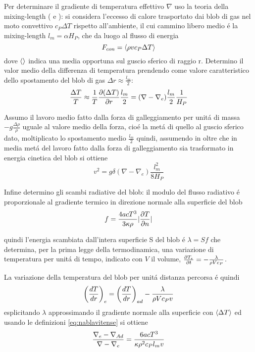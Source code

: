 \documentclass[../main.tex]{subfiles}
\begin{document}
Per determinare il gradiente di temperatura effettivo $\nabla$ uso la teoria della mixing-length (\cite{prandtl25tur} e \cite{vitense53kon}):
si considera l'eccesso di calore trasportato dai blob di gas nel moto convettivo $c_P\Delta T$ rispetto all'ambiente, il cui cammino libero medio \'e la mixing-length $l_m=\alpha H_P$, che da luogo al flusso di energia
\begin{equation}
F_{con}=\exv{\rho vc_P\Delta T}\label{eq:convectiveflux}
\end{equation}
dove $\exv{}$ indica una media opportuna sul guscio sferico di raggio r. Determino il valor medio della differenza di temperatura prendendo come valore caratteristico dello spostamento del blob di gas $\Delta r\approx\frac{l_m}{2}$:
\begin{equation}
\frac{\Delta T}{T}\approx\frac{1}{T}\PDy{r}{(\Delta T)}\frac{l_m}{2}=(\nabla-\nabla_e)\frac{l_m}{2}\frac{1}{H_P}
\end{equation}

Assumo il lavoro medio fatto dalla forza di galleggiamento per unit\'a di massa $-g\frac{\Delta\rho}{\rho}$ uguale al valore medio della forza, cio\'e la met\'a di quello al guscio sferico dato, moltiplicato lo spostamento medio $\frac{l_m}{2}$ quindi, assumendo in oltre che in media met\'a del lavoro fatto dalla forza di galleggiamento sia trasformato in energia cinetica del blob si ottiene
\begin{equation}
v^2=g\delta(\nabla-\nabla_e)\frac{l_m^2}{8H_P}\label{eq:blobvelocity}
\end{equation}

Infine determino gli scambi radiative del blob: il modulo del flusso radiativo \'e proporzionale al gradiente termico in direzione normale alla superficie del blob
\begin{equation}
f=\frac{4acT^3}{3\kappa\rho}|\PDy{n}{T}|
\end{equation}

quindi l'energia scambiata dall'intera superficie S del blob \'e $\lambda=Sf$ che determina, per la prima legge della termodinamica, una variazione di temperatura per unit\'a di tempo, indicato con $V$ il volume, $\PDy{t}{T_e}=-\frac{\lambda}{\rho Vc_P}$.

La variazione della temperatura del blob per unit\'a distanza percorsa \'e quindi
\begin{equation}
\Dcvar{\TDy{r}{T}}{e}=\Dcvar{\TDy{r}{T}}{ad}-\frac{\lambda}{\rho Vc_Pv}\label{eq:Tchangelength}
\end{equation}
esplicitando $\lambda$ approssimando il gradiente normale alla superficie con $\exv{\Delta T}$ ed usando le definizioni \eqref{eq:nablavitense} si ottiene
\begin{equation}
\frac{\nabla_e-\nad{}}{\nabla-\nabla_e}=\frac{6acT^3}{\kappa\rho^2c_Pl_mv}
\end{equation}
\end{document}
